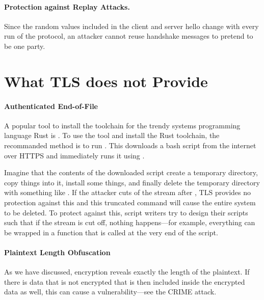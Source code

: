 \paragraph{Protection against Replay Attacks.} Since the random values included in the client and server hello change with every run of the protocol, an attacker cannot reuse handshake messages to pretend to be one party.


\section{What TLS does not Provide}

\paragraph{Authenticated End-of-File}
A popular tool to install the toolchain for the trendy systems programming language Rust is . To use the tool and install the Rust toolchain, the recommanded method is to run . This downloads a bash script from the internet over HTTPS and immediately runs it using .

Imagine that the contents of the downloaded script create a temporary directory, copy things into it, install some things, and finally delete the temporary directory with something like . If the attacker cuts of the stream after , TLS provides no protection against this and this truncated command will cause the entire system to be deleted. To protect against this, script writers try to design their scripts such that if the stream is cut off, nothing happens---for example, everything can be wrapped in a function that is called at the very end of the script.

\paragraph{Plaintext Length Obfuscation}
As we have discussed, encryption reveals exactly the length of the plaintext. If there is data that is not encrypted that is then included inside the encrypted data as well, this can cause a vulnerability---see the CRIME attack.
